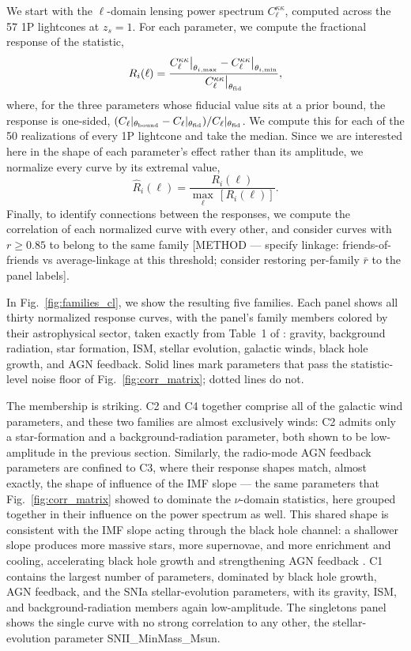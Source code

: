 \documentclass[linenumbers,trackchanges, twocolumn]{aastex701}
\begin{document}
We start with the $\ell$-domain lensing power spectrum $C_\ell^{\kappa\kappa}$, computed across the 57 1P lightcones at $z_s=1$. For each parameter, we compute the fractional response of the statistic,
\begin{equation}\label{eq:response}
R_i(\ell) = \dfrac{C_{\ell}^{\kappa\kappa}\big|_{\theta_{i,\rm max}} - C_{\ell}^{\kappa\kappa}\big|_{\theta_{i,\rm min}}}{C_{\ell}^{\kappa\kappa}\big|_{\theta_{\rm fid}}},
\end{equation}
where, for the three parameters whose fiducial value sits at a prior bound, the response is one-sided, $(C_\ell|_{\theta_{\rm bound}} - C_\ell|_{\theta_{\rm fid}})/C_\ell|_{\theta_{\rm fid}}$. We compute this for each of the 50 realizations of every 1P lightcone and take the median. Since we are interested here in the shape of each parameter's effect rather than its amplitude, we normalize every curve by its extremal value,
\begin{equation}\label{eq:rhat}
\hat{R}_i(\ell) = \dfrac{R_i(\ell)}{\max_\ell\,[R_i(\ell)]}.
\end{equation}
Finally, to identify connections between the responses, we compute the correlation of each normalized curve with every other, and consider curves with $r \geq 0.85$ to belong to the same family [METHOD --- specify linkage: friends-of-friends vs average-linkage at this threshold; consider restoring per-family $\bar r$ to the panel labels].
 
In Fig.~\ref{fig:families_cl}, we show the resulting five families. Each panel shows all thirty normalized response curves, with the panel's family members colored by their astrophysical sector, taken exactly from Table~1 of \citet{Genel-2026}: gravity, background radiation, star formation, ISM, stellar evolution, galactic winds, black hole growth, and AGN feedback. Solid lines mark parameters that pass the statistic-level noise floor of Fig.~\ref{fig:corr_matrix}; dotted lines do not. 
 
The membership is striking. C2 and C4 together comprise all of the galactic wind parameters, and these two families are almost exclusively winds: C2 admits only a star-formation and a background-radiation parameter, both shown to be low-amplitude in the previous section. Similarly, the radio-mode AGN feedback parameters are confined to C3, where their response shapes match, almost exactly, the shape of influence of the IMF slope --- the same parameters that Fig.~\ref{fig:corr_matrix} showed to dominate the $\nu$-domain statistics, here grouped together in their influence on the power spectrum as well. This shared shape is consistent with the IMF slope acting through the black hole channel: a shallower slope produces more massive stars, more supernovae, and more enrichment and cooling, accelerating black hole growth and strengthening AGN feedback \citep{Lee-2024}. C1 contains the largest number of parameters, dominated by black hole growth, AGN feedback, and the SNIa stellar-evolution parameters, with its gravity, ISM, and background-radiation members again low-amplitude. The singletons panel shows the single curve with no strong correlation to any other, the stellar-evolution parameter SNII\_MinMass\_Msun.
 
\end{document}
